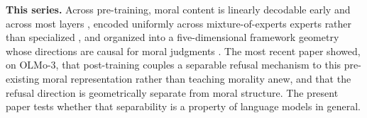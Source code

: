 \textbf{This series.} Across pre-training, moral content is linearly decodable early
and across most layers \citep{reblitzrichardson2026fragility}, encoded uniformly
across mixture-of-experts experts rather than specialized
\citep{reblitzrichardson2026dilution}, and organized into a five-dimensional
framework geometry \citep{reblitzrichardson2026geometry} whose directions are
causal for moral judgments \citep{reblitzrichardson2026causal}. The most recent
paper \citep{reblitzrichardson2026alignment} showed, on OLMo-3, that post-training
couples a separable refusal mechanism to this pre-existing moral representation
rather than teaching morality anew, and that the refusal direction is geometrically
separate from moral structure. The present paper tests whether that separability
is a property of language models in general.
